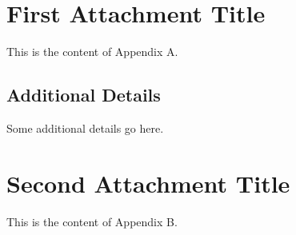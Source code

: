
\appendix

\chapter{First Attachment Title}

    \label{ap:Appendix A}
    This is the content of Appendix A.

    \section{Additional Details}
        Some additional details go here.

\chapter{Second Attachment Title}
    \label{ap:Appendix B}
    This is the content of Appendix B.